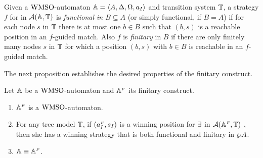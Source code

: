 \begin{definition}\label{def:StratfunctionalFinitary}
Given a $\mathrm{WMSO}$-automaton $\mathbb{A} = \langle{A,\Delta,\Omega,a_I}\rangle$ and transition system $\mathbb{T}$, a strategy $f$ for \eloise in $\mathcal{A}(\mathbb{A},\mathbb{T})$ is \emph{functional in $B \subseteq A$} (or simply functional, if $B=A$) if for each node $s$ in $\mathbb{T}$ there is at most one $b \in B$ such that $(b,s)$ is a reachable position in an $f$-guided match. Also $f$ is \emph{finitary} in $B$ if there are only finitely many nodes $s$ in $\mathbb{T}$ for which a position $(b,s)$ with $b \in B$ is reachable in an $f$-guided match.
\end{definition}



The next proposition establishes the desired properties of the finitary
construct.

\begin{theorem}
\label{PROP_facts_finConstrwmso}
Let $\mathbb{A}$ be a $\mathrm{WMSO}$-automaton and $\mathbb{A}^{{\scriptscriptstyle F}}$ its finitary construct.
\begin{enumerate}[(1)]
   pt
\item $\mathbb{A}^{{\scriptscriptstyle F}}$ is a $\mathrm{WMSO}$-automaton.\label{point:finConstrAut-w}
\item 
For any tree model $\mathbb{T}$, if $(a_I^{{\scriptscriptstyle F}},s_I)$ is a winning position for 
$\exists$ in $\mathcal{A}(\mathbb{A}^{{\scriptscriptstyle F}},\mathbb{T})$ , then she has a winning strategy that
is both functional and finitary in $\wp A$.
  \label{point:finConstrStrategy}
\item $\mathbb{A} \equiv \mathbb{A}^{{\scriptscriptstyle F}}$. \label{point:finConstrEquiv}
\end{enumerate}
\end{theorem}

